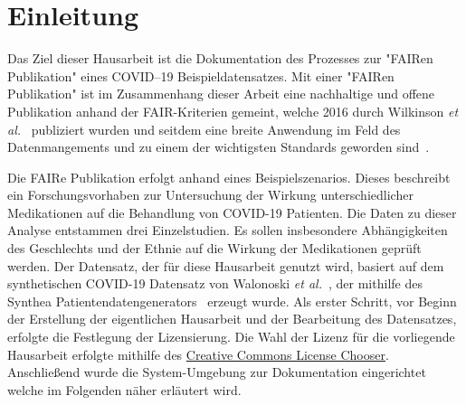 \documentclass[12pt,a4paper,toc=bibliographynumbered,toc=indenttextentries]{scrreprt}
\begin{document}
	\chapter{Einleitung}
	Das Ziel dieser Hausarbeit ist die Dokumentation des Prozesses zur "FAIRen Publikation" eines COVID--19 Beispieldatensatzes. Mit einer "FAIRen Publikation" ist im Zusammenhang dieser Arbeit eine nachhaltige und offene Publikation anhand der FAIR-Kriterien gemeint, welche 2016 durch Wilkinson \textit{et al.}~\cite{10.1038/sdata.2016.18} publiziert wurden und seitdem eine breite Anwendung im Feld des Datenmangements und zu einem der wichtigsten Standards geworden sind~\cite{10.1016/j.cels.2019.09.011}. \par
	Die FAIRe Publikation erfolgt anhand eines Beispielszenarios. Dieses beschreibt ein Forschungsvorhaben zur Untersuchung der Wirkung unterschiedlicher Medikationen auf die Behandlung von COVID-19 Patienten. Die Daten zu dieser Analyse entstammen drei Einzelstudien. Es sollen insbesondere Abhängigkeiten des Geschlechts und der Ethnie auf die Wirkung der Medikationen geprüft werden. Der Datensatz, der für diese Hausarbeit genutzt wird, basiert auf dem synthetischen COVID-19 Datensatz von Walonoski \textit{et al.}~\cite{10.1016/j.ibmed.2020.100007}, der mithilfe des Synthea Patientendatengenerators~\cite{10.1093/jamia/ocx079} erzeugt wurde. 
	Als erster Schritt, vor Beginn der Erstellung der eigentlichen Hausarbeit und der Bearbeitung des Datensatzes, erfolgte die Festlegung der Lizensierung. Die Wahl der Lizenz für die vorliegende Hausarbeit erfolgte mithilfe des \href{https://creativecommons.org/choose/}{Creative Commons License Chooser}. Anschließend wurde die System-Umgebung zur Dokumentation eingerichtet welche im Folgenden näher erläutert wird.
				
\end{document}
